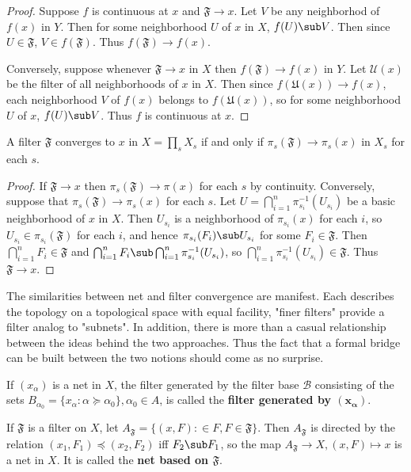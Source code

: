 \begin{proof}
Suppose $f$ is continuous at $x$ and $\mathfrak{F}\to x$. Let $V$ be any neighborhod of $f(x)$ in $Y$. Then for some neighborhood $U$ of $x$ in $X$, $f(U)\sub V$. Then since $U\in\mathfrak{F}$, $V\in f(\mathfrak{F})$. Thus $f(\mathfrak{F})\to f(x)$.\par
Conversely, suppose whenever $\mathfrak{F}\to x$ in $X$ then $f(\mathfrak{F})\to f(x)$ in $Y$. Let $\mathcal{U}(x)$ be the filter of all neighborhoods of $x$ in $X$. Then since $f(\mathfrak{U}(x))\to f(x)$, each neighborhood $V$ of $f(x)$ belongs to $f(\mathfrak{U}(x))$, so for some neighborhood $U$ of $x$, $f(U)\sub V$. Thus $f$ is continuous at $x$.
\end{proof}
\begin{proposition}
A filter $\mathfrak{F}$ converges to $x$ in $X=\prod_sX_s$ if and only if $\pi_s(\mathfrak{F})\to\pi_s(x)$ in $X_s$ for each $s$.
\end{proposition}
\begin{proof}
If $\mathfrak{F}\to x$ then $\pi_s(\mathfrak{F})\to\pi(x)$ for each $s$ by continuity. Conversely, suppose that $\pi_s(\mathfrak{F})\to\pi_s(x)$ for each $s$. Let $U=\bigcap_{i=1}^{n}\pi_{s_i}^{-1}(U_{s_i})$ be a basic neighborhood of $x$ in $X$. Then $U_{s_i}$ is a neighborhood of $\pi_{s_i}(x)$ for each $i$, so $U_{s_i}\in\pi_{s_i}(\mathfrak{F})$ for each $i$, and hence $\pi_{s_i}(F_i)\sub U_{s_i}$ for some $F_i\in\mathfrak{F}$. Then $\bigcap_{i=1}^{n}F_i\in\mathfrak{F}$ and $\bigcap_{i=1}^{n}F_i\sub\bigcap_{i=1}^{n}\pi^{-1}_{s_i}(U_{s_i})$, so $\bigcap_{i=1}^{n}\pi^{-1}_{s_i}(U_{s_i})\in\mathfrak{F}$. Thus $\mathfrak{F}\to x$.
\end{proof}
The similarities between net and filter convergence are manifest. Each describes the topology on a topological space with equal facility, "finer filters" provide a filter analog to "subnets". In addition, there is more than a casual relationship between the ideas behind the two approaches. Thus the fact that a formal bridge can be built between the two notions should come as no surprise.
\begin{definition}
If $(x_\alpha)$ is a net in $X$, the filter generated by the filter base $\mathcal{B}$ consisting of the sets $B_{\alpha_0}=\{x_\alpha:\alpha\succeq\alpha_0\},\alpha_0\in A$, is called the \textbf{filter generated by $\bm{(x_{\alpha})}$}.
\end{definition}
\begin{definition}
If $\mathfrak{F}$ is a filter on $X$, let $A_{\mathfrak{F}}=\{(x,F):\in F,F\in\mathfrak{F}\}$. Then $A_{\mathfrak{F}}$ is directed by the relation $(x_1,F_1)\preceq(x_2,F_2)$ iff $F_2\sub F_1$, so the map $A_{\mathfrak{F}}\to X,(x,F)\mapsto x$ is a net in $X$. It is called the \textbf{net based on $\mathfrak{F}$}.
\end{definition}
